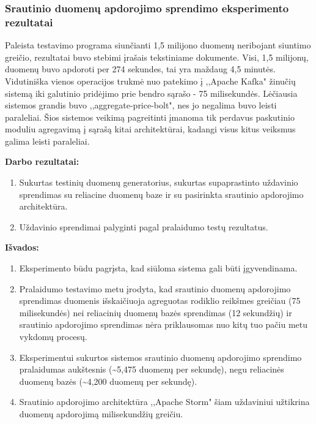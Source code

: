 \documentclass{VUMIFPSkursinis}
\begin{document}
\subsubsection{Srautinio duomenų apdorojimo sprendimo eksperimento rezultatai}
Paleista testavimo programa siunčianti 1,5 milijono duomenų neribojant siuntimo greičio, rezultatai buvo stebimi įrašais tekstiniame dokumente.
Visi, 1,5 milijonų, duomenų buvo apdoroti per 274 sekundes, tai yra maždaug 4,5 minutės. Vidutiniška vienos operacijos trukmė nuo 
patekimo į ,,Apache Kafka" žinučių sistemą iki galutinio pridėjimo prie bendro sąrašo - 75 milisekundės.
Lėčiausia sistemos grandis buvo ,,aggregate-price-bolt", nes jo negalima buvo leisti paraleliai. Šios sistemos veikimą pagreitinti 
įmanoma tik perdavus paskutinio moduliu agregavimą į sąrašą kitai architektūrai, kadangi visus kitus veiksmus galima leisti paraleliai.


\textbf{Darbo rezultatai:}
\vspace{1 mm}

    \begin{enumerate}
        \item Sukurtas testinių duomenų generatorius, 
        sukurtas supaprastinto uždavinio sprendimas su reliacine duomenų baze 
         ir su pasirinkta srautinio apdorojimo architektūra.
        \item Uždavinio sprendimai palyginti pagal pralaidumo testų rezultatus.
    \end{enumerate}
    \vspace{1 mm}

\textbf{Išvados:}
\vspace{1 mm}

    \begin{enumerate}
    \item Eksperimento būdu pagrįsta, kad siūloma sistema gali būti įgyvendinama.
    \item Pralaidumo testavimo metu įrodyta, kad srautinio duomenų apdorojimo sprendimas duomenis išskaičiuoja 
    agreguotas rodiklio reikšmes greičiau (75 milisekundės) nei reliacinių duomenų bazės sprendimas (12 sekundžių) 
    ir srautinio apdorojimo sprendimas nėra priklausomas nuo kitų tuo pačiu metu vykdomų procesų.
    \item Eksperimentui sukurtos sistemos srautinio duomenų apdorojimo sprendimo pralaidumas aukštesnis 
    (\textasciitilde5,475 duomenų per sekundę), negu reliacinės duomenų bazės (\textasciitilde 4,200 duomenų per sekundę). 
    \item Srautinio apdorojimo architektūra ,,Apache Storm" šiam uždaviniui užtikrina duomenų apdorojimą milisekundžių greičiu.  

    \end{enumerate}

\printbibliography[heading=bibintoc] 
\end{document}
